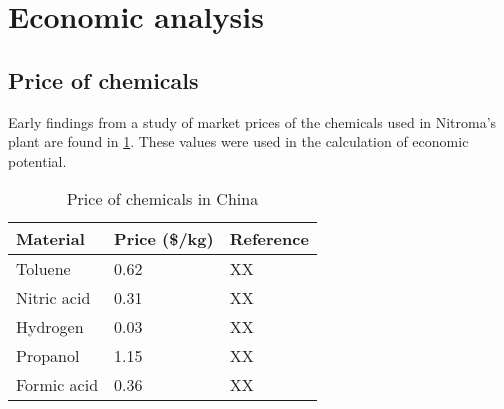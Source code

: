 \section{Economic analysis}
\label{app:economics}
\subsection{Price of chemicals}

Early findings from a study of market prices of the chemicals used in Nitroma's plant are found in \cref{tab:material-prices}. These values were used in the calculation of economic potential.

\begin{table}[h] 
\centering
\caption{Price of chemicals in China}
\label{tab:material-prices}
\begin{tabular}{lll}
    \toprule
    Material    & Price (\$/kg) & Reference \\ \midrule
    Toluene     & 0.62          & XX        \\
    Nitric acid & 0.31          & XX        \\
    Hydrogen    & 0.03         & XX        \\
    Propanol    & 1.15          & XX        \\
    Formic acid & 0.36          & XX        \\ \bottomrule
\end{tabular}
\end{table}

